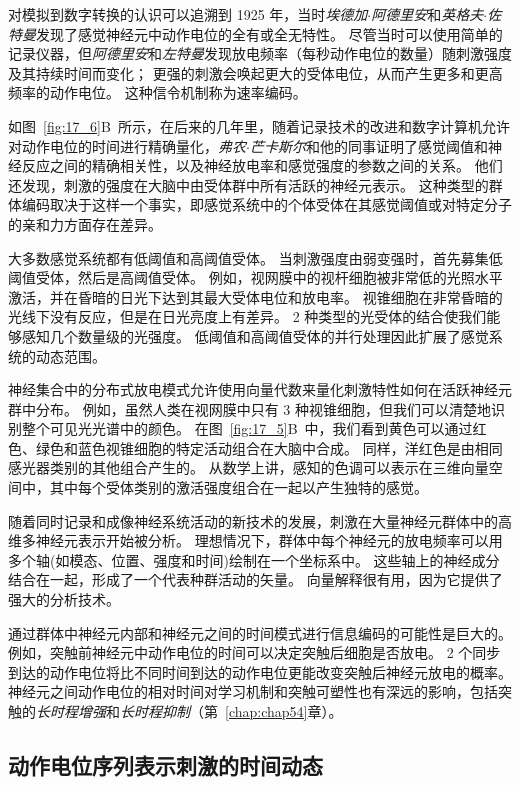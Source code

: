 对模拟到数字转换的认识可以追溯到 1925 年，当时\textit{埃德加$\cdot$阿德里安}和\textit{英格夫$\cdot$佐特曼}发现了感觉神经元中动作电位的全有或全无特性。 
尽管当时可以使用简单的记录仪器，但\textit{阿德里安}和\textit{左特曼}发现放电频率（每秒动作电位的数量）随刺激强度及其持续时间而变化； 
更强的刺激会唤起更大的受体电位，从而产生更多和更高频率的动作电位。 
这种信令机制称为速率编码。


如图~\ref{fig:17_6}B~所示，在后来的几年里，随着记录技术的改进和数字计算机允许对动作电位的时间进行精确量化，\textit{弗农$\cdot$芒卡斯尔}和他的同事证明了感觉阈值和神经反应之间的精确相关性，以及神经放电率和感觉强度的参数之间的关系。
他们还发现，刺激的强度在大脑中由受体群中所有活跃的神经元表示。
这种类型的群体编码取决于这样一个事实，即感觉系统中的个体受体在其感觉阈值或对特定分子的亲和力方面存在差异。


大多数感觉系统都有低阈值和高阈值受体。 
当刺激强度由弱变强时，首先募集低阈值受体，然后是高阈值受体。 
例如，视网膜中的视杆细胞被非常低的光照水平激活，并在昏暗的日光下达到其最大受体电位和放电率。 
视锥细胞在非常昏暗的光线下没有反应，但是在日光亮度上有差异。 
2 种类型的光受体的结合使我们能够感知几个数量级的光强度。
低阈值和高阈值受体的并行处理因此扩展了感觉系统的动态范围。


神经集合中的分布式放电模式允许使用向量代数来量化刺激特性如何在活跃神经元群中分布。 
例如，虽然人类在视网膜中只有 3 种视锥细胞，但我们可以清楚地识别整个可见光光谱中的颜色。
在图~\ref{fig:17_5}B~中，我们看到黄色可以通过红色、绿色和蓝色视锥细胞的特定活动组合在大脑中合成。
同样，洋红色是由相同感光器类别的其他组合产生的。 
从数学上讲，感知的色调可以表示在三维向量空间中，其中每个受体类别的激活强度组合在一起以产生独特的感觉。


随着同时记录和成像神经系统活动的新技术的发展，刺激在大量神经元群体中的高维多神经元表示开始被分析。
理想情况下，群体中每个神经元的放电频率可以用多个轴(如模态、位置、强度和时间)绘制在一个坐标系中。
这些轴上的神经成分结合在一起，形成了一个代表种群活动的矢量。
向量解释很有用，因为它提供了强大的分析技术。


通过群体中神经元内部和神经元之间的时间模式进行信息编码的可能性是巨大的。
例如，突触前神经元中动作电位的时间可以决定突触后细胞是否放电。
2 个同步到达的动作电位将比不同时间到达的动作电位更能改变突触后神经元放电的概率。
神经元之间动作电位的相对时间对学习机制和突触可塑性也有深远的影响，包括突触的\textit{长时程增强}和\textit{长时程抑制}（第~\ref{chap:chap54}章）。



\subsection{动作电位序列表示刺激的时间动态}

